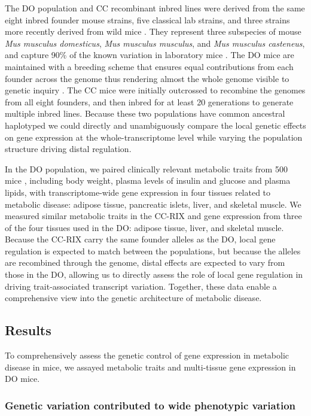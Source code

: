 \documentclass[
]{article}
\begin{document}
The DO population and CC recombinant inbred lines were derived from the
same eight inbred founder mouse strains, five classical lab strains, and
three strains more recently derived from wild mice \cite{pmid22892839}.
They represent three subspecies of mouse
\textit{Mus musculus domesticus}, \textit{Mus musculus musculus}, and
\textit{Mus musculus casteneus}, and capture 90\% of the known variation
in laboratory mice \cite{pmid31133439}. The DO mice are maintained with
a breeding scheme that ensures equal contributions from each founder
across the genome thus rendering almost the whole genome visible to
genetic inquiry \cite{pmid22892839}. The CC mice were initially
outcrossed to recombine the genomes from all eight founders, and then
inbred for at least 20 generations to generate multiple inbred lines.
Because these two populations have common ancestral haplotyped we could
directly and unambiguously compare the local genetic effects on gene
expression at the whole-transcriptome level while varying the population
structure driving distal regulation.

In the DO population, we paired clinically relevant metabolic traits
from 500 mice \cite{pmid29567659}, including body weight, plasma levels
of insulin and glucose and plasma lipids, with transcriptome-wide gene
expression in four tissues related to metabolic disease: adipose tissue,
pancreatic islets, liver, and skeletal muscle. We measured similar
metabolic traits in the CC-RIX and gene expression from three of the
four tissues used in the DO: adipose tissue, liver, and skeletal muscle.
Because the CC-RIX carry the same founder alleles as the DO, local gene
regulation is expected to match between the populations, but because the
alleles are recombined through the genome, distal effects are expected
to vary from those in the DO, allowing us to directly assess the role of
local gene regulation in driving trait-associated transcript variation.
Together, these data enable a comprehensive view into the genetic
architecture of metabolic disease.

\subsection{Results}\label{results}

To comprehensively assess the genetic control of gene expression in
metabolic disease in mice, we assayed metabolic traits and multi-tissue
gene expression in DO mice.

\subsubsection{Genetic variation contributed to wide phenotypic
variation}\label{genetic-variation-contributed-to-wide-phenotypic-variation}
\end{document}
